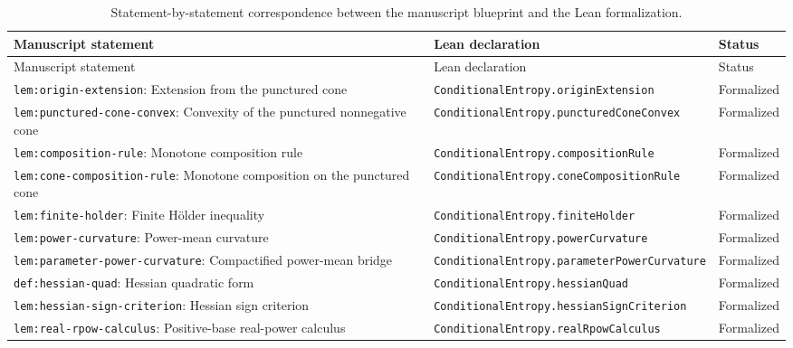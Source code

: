 
\providecommand{\BlueprintStatement}[2]{\texttt{#1}: #2}
\providecommand{\LeanDecl}[1]{\texttt{#1}}

\small
\begin{longtable}{@{}p{}p{}p{}@{}}
\caption{Statement-by-statement correspondence between the manuscript blueprint and the Lean formalization.}
\label{tab:blueprint-statement-correspondence}\\
\toprule
Manuscript statement & Lean declaration & Status \\
\midrule
\endfirsthead
\toprule
Manuscript statement & Lean declaration & Status \\
\midrule
\endhead
\bottomrule
\endfoot
\BlueprintStatement{lem:origin-extension}{Extension from the punctured cone} & \LeanDecl{ConditionalEntropy.originExtension} & Formalized \\
\BlueprintStatement{lem:punctured-cone-convex}{Convexity of the punctured nonnegative cone} & \LeanDecl{ConditionalEntropy.puncturedConeConvex} & Formalized \\
\BlueprintStatement{lem:composition-rule}{Monotone composition rule} & \LeanDecl{ConditionalEntropy.compositionRule} & Formalized \\
\BlueprintStatement{lem:cone-composition-rule}{Monotone composition on the punctured cone} & \LeanDecl{ConditionalEntropy.coneCompositionRule} & Formalized \\
\BlueprintStatement{lem:finite-holder}{Finite H\"older inequality} & \LeanDecl{ConditionalEntropy.finiteHolder} & Formalized \\
\BlueprintStatement{lem:power-curvature}{Power-mean curvature} & \LeanDecl{ConditionalEntropy.powerCurvature} & Formalized \\
\BlueprintStatement{lem:parameter-power-curvature}{Compactified power-mean bridge} & \LeanDecl{ConditionalEntropy.parameterPowerCurvature} & Formalized \\
\BlueprintStatement{def:hessian-quad}{Hessian quadratic form} & \LeanDecl{ConditionalEntropy.hessianQuad} & Formalized \\
\BlueprintStatement{lem:hessian-sign-criterion}{Hessian sign criterion} & \LeanDecl{ConditionalEntropy.hessianSignCriterion} & Formalized \\
\BlueprintStatement{lem:real-rpow-calculus}{Positive-base real-power calculus} & \LeanDecl{ConditionalEntropy.realRpowCalculus} & Formalized \\

\end{longtable}
